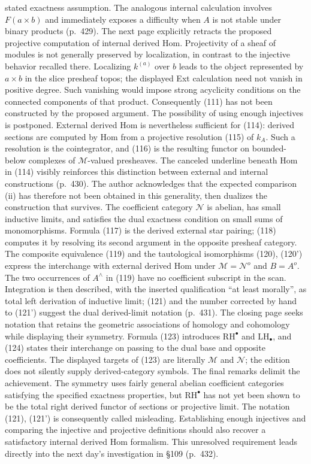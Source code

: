 \documentclass[10pt,oneside]{book}
\begin{document}
stated exactness assumption. The analogous internal calculation involves $F(a\times b)$ and immediately exposes a difficulty when $A$ is not stable under binary products (p.\ 429). The next page explicitly retracts the proposed projective computation of internal derived Hom. Projectivity of a sheaf of modules is not generally preserved by localization, in contrast to the injective behavior recalled there. Localizing $k^{(a)}$ over $b$ leads to the object represented by $a\times b$ in the slice presheaf topos; the displayed Ext calculation need not vanish in positive degree. Such vanishing would impose strong acyclicity conditions on the connected components of that product. Consequently (111) has not been constructed by the proposed argument. The possibility of using enough injectives is postponed. External derived Hom is nevertheless sufficient for (114): derived sections are computed by Hom from a projective resolution (115) of $k_A$. Such a resolution is the cointegrator, and (116) is the resulting functor on bounded-below complexes of $\mathcal M$-valued presheaves. The canceled underline beneath Hom in (114) visibly reinforces this distinction between external and internal constructions (p.\ 430). The author acknowledges that the expected comparison (ii) has therefore not been obtained in this generality, then dualizes the construction that survives. The coefficient category $\mathcal N$ is abelian, has small inductive limits, and satisfies the dual exactness condition on small sums of monomorphisms. Formula (117) is the derived external star pairing; (118) computes it by resolving its second argument in the opposite presheaf category. The composite equivalence (119) and the tautological isomorphisms (120), (120') express the interchange with external derived Hom under $\mathcal M=\mathcal N^o$ and $B=A^o$. The two occurrences of $A^\wedge$ in (119) have no coefficient subscript in the scan. Integration is then described, with the inserted qualification ``at least morally'', as total left derivation of inductive limit; (121) and the number corrected by hand to (121') suggest the dual derived-limit notation (p.\ 431). The closing page seeks notation that retains the geometric associations of homology and cohomology while displaying their symmetry. Formula (123) introduces $\mathrm{RH}^{\bullet}$ and $\mathrm{LH}_{\bullet}$, and (124) states their interchange on passing to the dual base and opposite coefficients. The displayed targets of (123) are literally $\mathcal M$ and $\mathcal N$; the edition does not silently supply derived-category symbols. The final remarks delimit the achievement. The symmetry uses fairly general abelian coefficient categories satisfying the specified exactness properties, but $\mathrm{RH}^{\bullet}$ has not yet been shown to be the total right derived functor of sections or projective limit. The notation (121), (121') is consequently called misleading. Establishing enough injectives and comparing the injective and projective definitions should also recover a satisfactory internal derived Hom formalism. This unresolved requirement leads directly into the next day's investigation in \S109 (p.\ 432).
\end{document}
